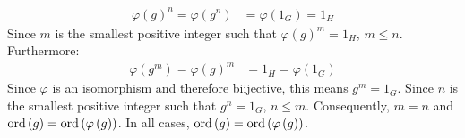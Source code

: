 \documentclass{article}
\begin{document}
\begin{equation}
    \begin{split}
        \varphi\left(g\right)^n = \varphi\left(g^n\right) & = \varphi\left(1_G\right) = 1_H
    \end{split}
\end{equation}
Since $m$ is the smallest positive integer such that $\varphi\left(g\right)^m = 1_H$, $m \leq n$. Furthermore:
\begin{equation}
    \begin{split}
        \varphi\left(g^m\right) = \varphi\left(g\right)^m & = 1_H = \varphi\left(1_G\right)
    \end{split}
\end{equation}
Since  $\varphi$ is an isomorphism and therefore biijective, this means $g^m = 1_G$. Since $n$ is the smallest positive integer such that $g^n = 1_G$, $n \leq m$. Consequently, $m = n$ and $\operatorname{ord}\left(g\right) = \operatorname{ord}\left(\varphi\left(g\right)\right)$. In all cases, $\operatorname{ord}\left(g\right) = \operatorname{ord}\left(\varphi\left(g\right)\right)$.

\clearpage
\end{document}
